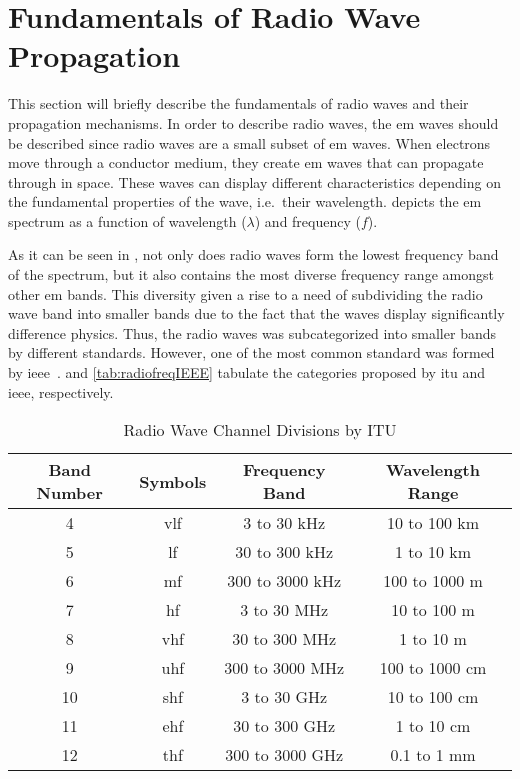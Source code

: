 \section{Fundamentals of Radio Wave Propagation}
\label{sec:fundradioprop}
This section will briefly describe the fundamentals of radio waves and their propagation mechanisms.
In order to describe radio waves, the \gls{em} waves should be described since radio waves are a small subset of \gls{em} waves.
When electrons move through a conductor medium, they create \gls{em}  waves that can propagate through in space.
These waves can display different characteristics depending on the fundamental properties of the wave,  i.e.\ their wavelength.
 depicts the \gls{em} spectrum as a function of wavelength ($\lambda$) and frequency ($f$).

As it can be seen in , not only does radio waves form the lowest frequency band of the spectrum, but it also contains the most diverse frequency range amongst other \gls{em} bands.
This diversity given a rise to a need of subdividing the radio wave band into smaller bands due to the fact that the waves display significantly difference physics.
Thus, the radio waves was subcategorized into smaller bands by different standards.
However, one of the most common standard was formed by \gls{ieee}~\cite{bruder2003ieee}.
 and \cref{tab:radiofreqIEEE} tabulate the categories proposed by \gls{itu} and \gls{ieee}, respectively.

\begin{table}[ht]
    \centering
    \begin{tabular}{ | c | c | c | c |  } \hline
      Band Number & Symbols & Frequency Band & Wavelength Range \\ \hline
      4 & \gls{vlf} & 3 to 30 kHz & 10 to 100 km\\
      5 & \gls{lf} & 30 to 300 kHz & 1 to 10 km\\
      6 & \gls{mf} & 300 to 3000 kHz & 100 to 1000 m\\
      7 & \gls{hf} & 3 to 30 MHz & 10 to 100 m\\
      8 & \gls{vhf} & 30 to 300 MHz & 1 to 10 m\\
      9 & \gls{uhf} & 300 to 3000 MHz & 100 to 1000 cm\\
      10 & \gls{shf} & 3 to 30 GHz & 10 to 100 cm\\
      11 & \gls{ehf} & 30 to 300 GHz & 1 to 10 cm\\
      12 & \gls{thf} & 300 to 3000 GHz & 0.1 to 1 mm\\ \hline
    \end{tabular}
    \label{tab:radiofreqITU}
    \caption{Radio Wave Channel Divisions by ITU}
\end{table}

